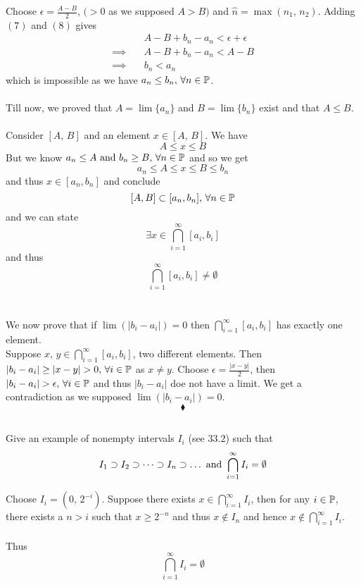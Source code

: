 Choose $\epsilon = \frac{A-B}{2},\, (>0$ as we supposed $A>B)$ and  $\hat{n}=\max(n_1,\, n_2)$. Adding $(7)$ and $(8)$ gives
\begin{align}
&A-B+ b_n-a_n<\epsilon+\epsilon\\
\implies\quad &A-B+ b_n-a_n <A-B\\
\implies\quad & b_n <a_n
\end{align}
which is impossible as we have $a_n \leq b_n,\, \forall n\in \mathbb{P}$.\\\\
Till now, we proved that $A=\lim \{a_n\} $ and $B=\lim \{b_n\}$ exist and that $A\leq B$.\\\\
Consider $[A,\, B]$ and an element $x\in [A,\, B]$. We have 
$$A\leq x\leq B$$
But we know $a_n\leq A\text{ and } b_n\geq B,\, \forall n\in \mathbb{P}$ and so we get  
$$a_n\leq A\leq x\leq B\leq b_n$$
and thus $x\in [a_n,b_n]$ and conclude 
$$[A,B]\subset [a_n,b_n],\,  \forall n \in \mathbb{P}$$ and we can state
$$\exists x\in  \bigcap^{\infty}_{i=1}[a_i,b_i]$$ and thus
$$\bigcap^{\infty}_{i=1}[a_i,b_i]\neq \emptyset$$
\\\\
We now prove that if $\lim \left(|b_i -a_i|\right)=0$ then $\bigcap^{\infty}_{i=1}[a_i,b_i]$ has exactly one element.\\
Suppose $x,\, y\in \bigcap^{\infty}_{i=1}[a_i,b_i]$, two different elements. Then $| b_i-a_i| \geq |x-y| >0,\, \forall i\in \mathbb{P}$ as $x\neq y$. Choose $\epsilon=\frac{|x-y|}{2}$, then 
$| b_i-a_i|  >\epsilon ,\, \forall i\in \mathbb{P}$ and thus $|b_i-a_i|$ doe not have a limit. We get a contradiction as we supposed $\lim \left(|b_i -a_i|\right)=0$.
$$\blacklozenge$$
\newpage
\subsection{}
\begin{tcolorbox}
Give an example of nonempty intervals $I_i$ (see $\mathbf{33.2}$) such that 
$$I_1\supset I_2 \supset \dots \supset I_n\supset \dots  \text{ and } \bigcap^{\infty}_{i=1}I_i=\emptyset $$
\end{tcolorbox}
Choose $I_i=(0,\, 2^{-i})$. Suppose there exists $x\in \bigcap^{\infty}_{i=1}I_i$, then for any $i\in \mathbb{P}$, there exists a $n > i$ such that $x\geq 2^{-n}$ and thus $x\not\in I_n$ and hence $x\not\in \bigcap^{\infty}_{i=1}I_i$.\\\\
Thus $$\bigcap^{\infty}_{i=1}I_i=\emptyset $$

